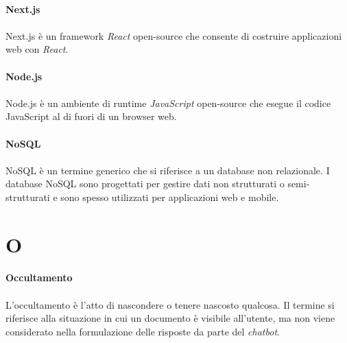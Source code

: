 \documentclass[10pt, a4paper]{article}
\begin{document}
\vspace{2em}
\paragraph{Next.js}\noindent\hrulefill
\paragraph{}Next.js è un framework \textit{React\pg} open-source che consente di costruire applicazioni web con \textit{React\pg}.

\vspace{2em}
\paragraph{Node.js}\noindent\hrulefill
\paragraph{}Node.js è un ambiente di runtime \textit{JavaScript\pg} open-source che esegue il codice JavaScript al di fuori di un browser web.

\vspace{2em}
\paragraph{NoSQL}\noindent\hrulefill
\paragraph{}NoSQL è un termine generico che si riferisce a un database non relazionale. I database NoSQL sono progettati per gestire dati non strutturati o semi-strutturati e sono spesso utilizzati per applicazioni web e mobile.

\newpage
\section{O}

\vspace{2em}
\paragraph{Occultamento}\noindent\hrulefill
\paragraph{}L’occultamento è l’atto di nascondere o tenere nascosto qualcosa. Il termine si riferisce alla situazione in cui un documento è visibile all’utente, ma non viene considerato nella formulazione delle risposte da parte del \textit{chatbot\pg}.
\end{document}
